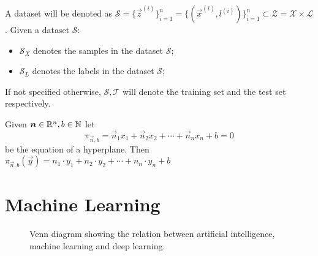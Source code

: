 \noindent A dataset will be denoted as $\mathcal{S} = \{\vec{z}^{(i)}\}_{i=1}^n = \{(\vec{x}^{(i)}, l^{(i)}) \}_{i=1}^n \subset \mathcal{Z} = \mathcal{X} \times \mathcal{L}$. Given a dataset $\mathcal{S}$:
\begin{itemize}
	\item $\mathcal{S}_X$ denotes the samples in the dataset $\mathcal{S}$;
	\item $\mathcal{S}_L$ denotes the labels in the dataset $\mathcal{S}$;
\end{itemize}
\noindent If not specified otherwise, $\mathcal{S}, \mathcal{T}$ will denote the training set and the test set respectively.

\noindent Given $\bm{n} \in \mathbb{R}^{n}, b \in \mathbb{N}$ let
\[
	\pi_{\vec{n},b} = \vec{n}_1x_1 + \vec{n}_2x_2 + \cdots + \vec{n}_nx_n + b = 0
\]
be the equation of a hyperplane. Then $\pi_{\vec{n},b}(\vec{y}) = n_1\cdot y_1 + n_2\cdot y_2 + \cdots + n_n \cdot y_n + b$

\section{Machine Learning}
\label{sec:ml}

\begin{figure}[H]
	\centering
	\caption[Venn diagram showing the relation between artificial intelligence, machine learning and deep learning]{Venn diagram showing the relation between artificial intelligence, machine learning and deep learning.}
	\label{fig:ai-ml-dl}
\end{figure}

